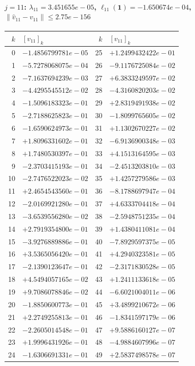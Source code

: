 \documentclass[11pt]{article}
\begin{document}
\paragraph{$j = 11$: $\lambda_{11} = 3.451655e-05$, \quad $\ell_{11}(\mathbf{1}) = -1.650674e-04$, \quad $\|\hat v_{11} - v_{11}\| \leq 2.75e-156$}
\begin{center}
{\footnotesize
\begin{tabular}{r@{\;\;}l@{\quad}r@{\;\;}l}
\toprule
$k$ & $[v_{11}]_k$ & $k$ & $[v_{11}]_k$ \\
\midrule
0 & $-1.4856799781e-05$ & 25 & $+1.2499432422e-01$ \\
1 & $-5.7278068075e-04$ & 26 & $-9.1176725084e-02$ \\
2 & $-7.1637694239e-03$ & 27 & $+6.3833249597e-02$ \\
3 & $-4.4295545512e-02$ & 28 & $-4.3160820203e-02$ \\
4 & $-1.5096183323e-01$ & 29 & $+2.8319491938e-02$ \\
5 & $-2.7188625823e-01$ & 30 & $-1.8099765605e-02$ \\
6 & $-1.6590624973e-01$ & 31 & $+1.1302670227e-02$ \\
7 & $+1.8096331602e-01$ & 32 & $-6.9136900348e-03$ \\
8 & $+1.7480530397e-01$ & 33 & $+4.1513164595e-03$ \\
9 & $-2.3703415193e-01$ & 34 & $-2.4513203810e-03$ \\
10 & $-2.7476522023e-02$ & 35 & $+1.4257279586e-03$ \\
11 & $+2.4654543560e-01$ & 36 & $-8.1788697947e-04$ \\
12 & $-2.0169921280e-01$ & 37 & $+4.6333704418e-04$ \\
13 & $-3.6539556280e-02$ & 38 & $-2.5948751235e-04$ \\
14 & $+2.7919354800e-01$ & 39 & $+1.4380411081e-04$ \\
15 & $-3.9276889886e-01$ & 40 & $-7.8929597375e-05$ \\
16 & $+3.5365056420e-01$ & 41 & $+4.2940323581e-05$ \\
17 & $-2.1390123647e-01$ & 42 & $-2.3171830528e-05$ \\
18 & $+4.5494057165e-02$ & 43 & $+1.2411133618e-05$ \\
19 & $+9.7086078846e-02$ & 44 & $-6.6021004011e-06$ \\
20 & $-1.8850600773e-01$ & 45 & $+3.4899210672e-06$ \\
21 & $+2.2749255813e-01$ & 46 & $-1.8341597179e-06$ \\
22 & $-2.2605014548e-01$ & 47 & $+9.5886160127e-07$ \\
23 & $+1.9996431926e-01$ & 48 & $-4.9884607996e-07$ \\
24 & $-1.6306691331e-01$ & 49 & $+2.5837498578e-07$ \\
\bottomrule
\end{tabular}
}
\end{center}
\end{document}
